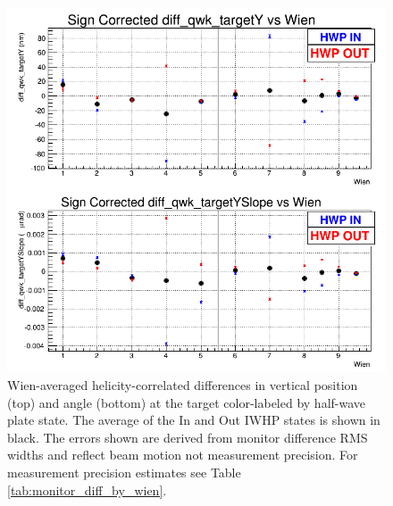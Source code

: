 \begin{figure}
\centering
\includegraphics[width=5.9in]{./Pictures/YDifferences_by_wien.png}
\caption{\label{fig:Ydiff_by_wien}Wien-averaged helicity-correlated differences in vertical position (top) and angle (bottom) at the target color-labeled by half-wave plate state. The average of the In and Out IWHP states is shown in black. The errors shown are derived from monitor difference RMS widths and reflect beam motion not measurement precision. For measurement precision estimates see Table \ref{tab:monitor_diff_by_wien}. }
\end{figure}

